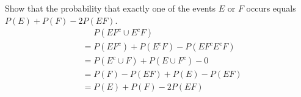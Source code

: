 \item Show that the probability that exactly one of the events $E$ or $F$ occurs equals $P(E) + P(F) - 2P(EF)$.
\begin{align*}
    &\phantom{{}={}} P(EF^c \cup E^cF)\\
    &= P(EF^c) + P(E^cF) - P(EF^cE^cF)\\
    &= P(E^c\cup F) + P(E\cup F^c) - 0\\
    &= P(F) - P(EF) + P(E) - P(EF)\\
    &= P(E) + P(F) - 2P(EF)
\end{align*}